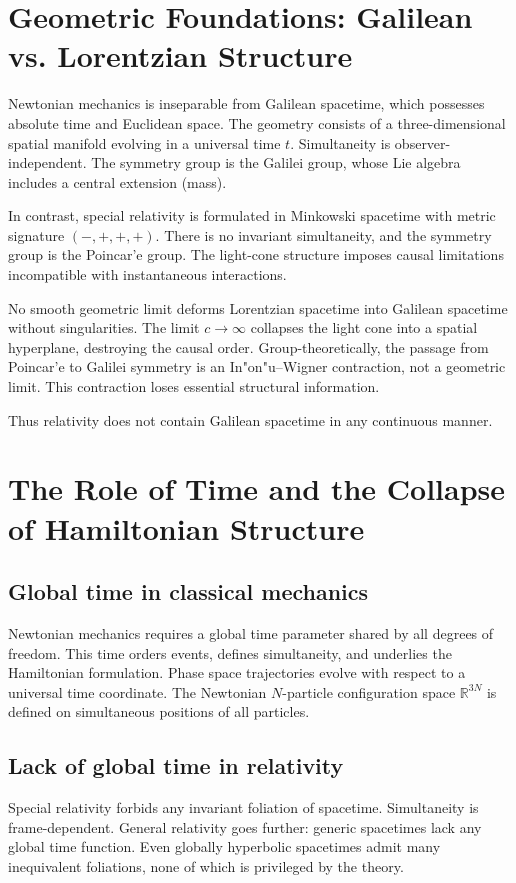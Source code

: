 \documentclass[12pt]{article}
\begin{document}
\section{Geometric Foundations: Galilean vs. Lorentzian Structure}
Newtonian mechanics is inseparable from Galilean spacetime, which possesses absolute time and Euclidean space. The geometry consists of a three-dimensional spatial manifold evolving in a universal time $t$. Simultaneity is observer-independent. The symmetry group is the Galilei group, whose Lie algebra includes a central extension (mass).

In contrast, special relativity is formulated in Minkowski spacetime with metric signature $(-,+,+,+)$. There is no invariant simultaneity, and the symmetry group is the Poincar'e group. The light-cone structure imposes causal limitations incompatible with instantaneous interactions.

No smooth geometric limit deforms Lorentzian spacetime into Galilean spacetime without singularities. The limit $c \to \infty$ collapses the light cone into a spatial hyperplane, destroying the causal order. Group-theoretically, the passage from Poincar'e to Galilei symmetry is an In"on"u--Wigner contraction, not a geometric limit. This contraction loses essential structural information.

Thus relativity does not contain Galilean spacetime in any continuous manner.

\section{The Role of Time and the Collapse of Hamiltonian Structure}
\subsection{Global time in classical mechanics}
Newtonian mechanics requires a global time parameter shared by all degrees of freedom. This time orders events, defines simultaneity, and underlies the Hamiltonian formulation. Phase space trajectories evolve with respect to a universal time coordinate. The Newtonian $N$-particle configuration space $\mathbb{R}^{3N}$ is defined on simultaneous positions of all particles.

\subsection{Lack of global time in relativity}
Special relativity forbids any invariant foliation of spacetime. Simultaneity is frame-dependent. General relativity goes further: generic spacetimes lack any global time function. Even globally hyperbolic spacetimes admit many inequivalent foliations, none of which is privileged by the theory.
\end{document}
